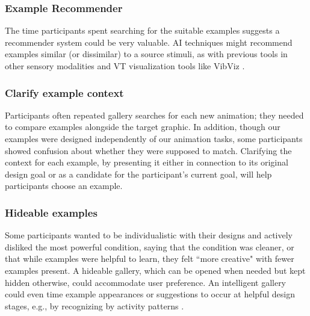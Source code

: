     
    \subsubsection{Example Recommender}
    The time participants spent searching for the suitable examples suggests a recommender system could be very valuable. %
    AI techniques might recommend examples similar (or dissimilar) to a source stimuli, as with previous tools in other sensory modalities \cite{Lee2010a} and VT 
    visualization tools like VibViz \cite{Seifi2015}.
    
    \subsubsection{Clarify example context}
    Participants often repeated gallery searches for each new animation; they needed to compare examples alongside the target graphic.
    In addition, though our examples were designed independently of our animation tasks, some participants showed confusion about whether they were supposed to match. %
    Clarifying the context for each example, by presenting it either in connection to its original design goal or as a candidate for the participant's current goal, will help participants choose an example.
    
    
    \subsubsection{Hideable examples}
    Some participants wanted to be individualistic with their designs and actively disliked the most powerful \hi condition, saying that the \none condition was cleaner, or that while examples were helpful to learn, they felt ``more creative" with fewer examples present.
    A hideable gallery, which can be opened when needed but kept hidden otherwise, could accommodate user preference.
    An intelligent gallery could even time example appearances or suggestions to occur at helpful design stages, e.g., by recognizing by activity patterns \cite{Warr2005,Dow2011}. %
    
